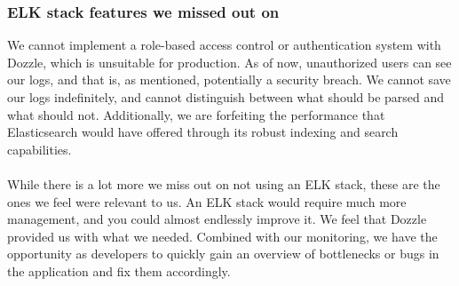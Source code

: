 \subsubsection*{ELK stack features we missed out on}
We cannot implement a role-based access control or authentication system with Dozzle, which is unsuitable for production. As of now, unauthorized users can see our logs, and that is, as mentioned, potentially a security breach. We cannot save our logs indefinitely, and cannot distinguish between what should be parsed and what should not. Additionally, we are forfeiting the performance that Elasticsearch would have offered through its robust indexing and search capabilities.
\\\\
While there is a lot more we miss out on not using an ELK stack, these are the ones we feel were relevant to us. An ELK stack would require much more management, and you could almost endlessly improve it. We feel that Dozzle provided us with what we needed. Combined with our monitoring, we have the opportunity as developers to quickly gain an overview of bottlenecks or bugs in the application and fix them accordingly. 